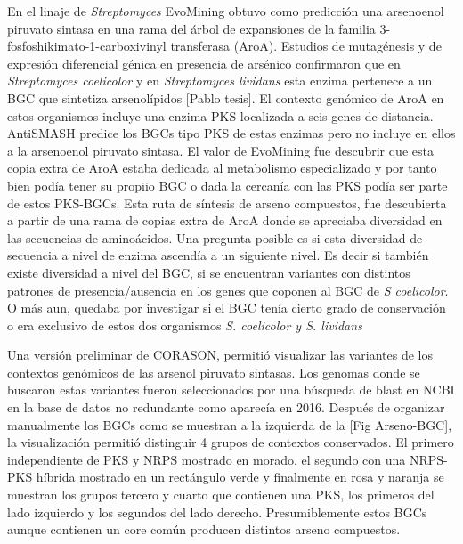 \documentclass[12pt,twoside]{reedthesis}
\begin{document}
  En el linaje de \emph{Streptomyces} EvoMining obtuvo como predicción una
  arsenoenol piruvato sintasa en una rama del árbol de expansiones de la
  familia 3-fosfoshikimato-1-carboxivinyl transferasa (AroA). Estudios de
  mutagénesis y de expresión diferencial génica en presencia de arsénico
  confirmaron que en \emph{Streptomyces coelicolor} y en
  \emph{Streptomyces lividans} esta enzima pertenece a un BGC que
  sintetiza arsenolípidos {[}Pablo tesis{]}. El contexto genómico de AroA
  en estos organismos incluye una enzima PKS localizada a seis genes de
  distancia. AntiSMASH predice los BGCs tipo PKS de estas enzimas pero no
  incluye en ellos a la arsenoenol piruvato sintasa. El valor de EvoMining
  fue descubrir que esta copia extra de AroA estaba dedicada al
  metabolismo especializado y por tanto bien podía tener su propiio BGC o
  dada la cercanía con las PKS podía ser parte de estos PKS-BGCs. Esta
  ruta de síntesis de arseno compuestos, fue descubierta a partir de una
  rama de copias extra de AroA donde se apreciaba diversidad en las
  secuencias de aminoácidos. Una pregunta posible es si esta diversidad de
  secuencia a nivel de enzima ascendía a un siguiente nivel. Es decir si
  también existe diversidad a nivel del BGC, si se encuentran variantes
  con distintos patrones de presencia/ausencia en los genes que coponen al
  BGC de \emph{S coelicolor}. O más aun, quedaba por investigar si el BGC
  tenía cierto grado de conservación o era exclusivo de estos dos
  organismos \emph{S. coelicolor y S. lividans}
  
  Una versión preliminar de CORASON, permitió visualizar las variantes de
  los contextos genómicos de las arsenol piruvato sintasas. Los genomas
  donde se buscaron estas variantes fueron seleccionados por una búsqueda
  de blast en NCBI en la base de datos no redundante como aparecía en
  2016. Después de organizar manualmente los BGCs como se muestran a la
  izquierda de la {[}Fig Arseno-BGC{]}, la visualización permitió
  distinguir 4 grupos de contextos conservados. El primero independiente
  de PKS y NRPS mostrado en morado, el segundo con una NRPS-PKS híbrida
  mostrado en un rectángulo verde y finalmente en rosa y naranja se
  muestran los grupos tercero y cuarto que contienen una PKS, los primeros
  del lado izquierdo y los segundos del lado derecho. Presumiblemente
  estos BGCs aunque contienen un core común producen distintos arseno
  compuestos.
  
\end{document}
